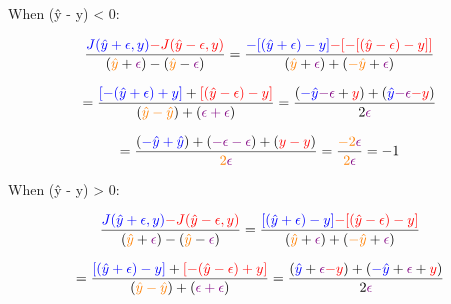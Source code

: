 \documentclass{article}
\begin{document}
When (ŷ - y) \textless{} 0:

\begin{displaymath}
\frac{\textcolor{blue}{J(\hat{y}+\epsilon, y)}
\textcolor{red}{-J(\hat{y}-\epsilon, y)}}
{(\textcolor{orange}{\hat{y}}+\textcolor{violet}{\epsilon})-(
\textcolor{orange}{\hat{y}}-\textcolor{violet}{\epsilon})}
=\frac{\textcolor{blue}{-[(\hat{y}+\epsilon)-y]}
\textcolor{red}{-[-[(\hat{y}-\epsilon)-y]]}}
{(\textcolor{orange}{\hat{y}}+\textcolor{violet}{\epsilon})+(
\textcolor{orange}{-\hat{y}}+\textcolor{violet}{\epsilon})}
\end{displaymath}

\begin{displaymath}
=\frac{\textcolor{blue}{[-(\hat{y}+\epsilon)+y]}+
\textcolor{red}{[(\hat{y}-\epsilon)-y]}}
{(\textcolor{orange}{\hat{y}-\hat{y}})+(\textcolor{violet}{\epsilon+\epsilon})}
=\frac{(\textcolor{blue}{-\hat{y}}\textcolor{violet}{-\epsilon}+\textcolor{red}{y})+
(\textcolor{blue}{\hat{y}}\textcolor{violet}{-\epsilon}\textcolor{red}{-y})}
{2\textcolor{violet}{\epsilon}}
\end{displaymath}

\begin{displaymath}
=\frac{(\textcolor{blue}{-\hat{y}+\hat{y}})+(\textcolor{violet}{-\epsilon-\epsilon})+
(\textcolor{red}{y-y})}{\textcolor{orange}{2}\textcolor{violet}{\epsilon}}
=\frac{\textcolor{orange}{-2}\textcolor{violet}{\epsilon}}
{\textcolor{orange}{2}\textcolor{violet}{\epsilon}}
= -1
\end{displaymath}


When (ŷ - y) \textgreater{} 0:

\begin{displaymath}
\frac{\textcolor{blue}{J(\hat{y}+\epsilon, y)}
\textcolor{red}{-J(\hat{y}-\epsilon, y)}}
{(\textcolor{orange}{\hat{y}}+\textcolor{violet}{\epsilon})-(
\textcolor{orange}{\hat{y}}-\textcolor{violet}{\epsilon})}
=\frac{\textcolor{blue}{[(\hat{y}+\epsilon)-y]}
\textcolor{red}{-[(\hat{y}-\epsilon)-y]}}
{(\textcolor{orange}{\hat{y}}+\textcolor{violet}{\epsilon})+(
\textcolor{orange}{-\hat{y}}+\textcolor{violet}{\epsilon})}
\end{displaymath}

\begin{displaymath}
=\frac{\textcolor{blue}{[(\hat{y}+\epsilon)-y]}+
\textcolor{red}{[-(\hat{y}-\epsilon)+y]}}
{(\textcolor{orange}{\hat{y}-\hat{y}})+(\textcolor{violet}{\epsilon+\epsilon})}
=\frac{(\textcolor{blue}{\hat{y}}+\textcolor{violet}{\epsilon}\textcolor{red}{-y})+
(\textcolor{blue}{-\hat{y}}+\textcolor{violet}{\epsilon}+\textcolor{red}{y})}
{2\textcolor{violet}{\epsilon}}
\end{displaymath}
\end{document}
